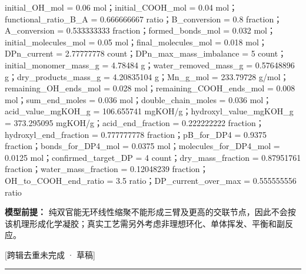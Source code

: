 \documentclass[UTF8,11pt,a4paper]{ctexart}
\begin{document}
initial\_OH\_mol = 0.06 mol；initial\_COOH\_mol = 0.04 mol；functional\_ratio\_B\_A = 0.666666667 ratio；B\_conversion = 0.8 fraction；A\_conversion = 0.533333333 fraction；formed\_bonds\_mol = 0.032 mol；initial\_molecules\_mol = 0.05 mol；final\_molecules\_mol = 0.018 mol；DPn\_current = 2.77777778 count；DPn\_max\_mass\_imbalance = 5 count；initial\_monomer\_mass\_g = 4.78484 g；water\_removed\_mass\_g = 0.57648896 g；dry\_products\_mass\_g = 4.20835104 g；Mn\_g\_mol = 233.79728 g/mol；remaining\_OH\_ends\_mol = 0.028 mol；remaining\_COOH\_ends\_mol = 0.008 mol；sum\_end\_moles = 0.036 mol；double\_chain\_moles = 0.036 mol；acid\_value\_mgKOH\_g = 106.655741 mgKOH/g；hydroxyl\_value\_mgKOH\_g = 373.295095 mgKOH/g；acid\_end\_fraction = 0.222222222 fraction；hydroxyl\_end\_fraction = 0.777777778 fraction；pB\_for\_DP4 = 0.9375 fraction；bonds\_for\_DP4\_mol = 0.0375 mol；molecules\_for\_DP4\_mol = 0.0125 mol；confirmed\_target\_DP = 4 count；dry\_mass\_fraction = 0.87951761 fraction；water\_mass\_fraction = 0.12048239 fraction；OH\_to\_COOH\_end\_ratio = 3.5 ratio；DP\_current\_over\_max = 0.555555556 ratio\par
\noindent\textbf{模型前提：}
纯双官能无环线性缩聚不能形成三臂及更高的交联节点，因此不会按该机理形成化学凝胶；真实工艺需另外考虑非理想环化、单体挥发、平衡和副反应。\par
\noindent\textcolor{red!65!black}{[跨辑去重未完成 · 草稿]} \par
\medskip\hrule\medskip
{}
\end{document}
